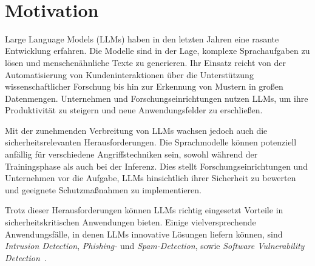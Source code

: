 \documentclass[german,exposee,master]{i1thesis}
\begin{document}
\makethetitle\

\section{Motivation}\label{sec:motivation}

Large Language Models (LLMs) haben in den letzten Jahren eine rasante Entwicklung erfahren. 
Die Modelle sind in der Lage, komplexe Sprachaufgaben zu lösen und menschenähnliche Texte zu generieren. 
Ihr Einsatz reicht von der Automatisierung von Kundeninteraktionen über die Unterstützung wissenschaftlicher Forschung bis hin zur Erkennung von Mustern in großen Datenmengen. 
Unternehmen und Forschungseinrichtungen nutzen LLMs, um ihre Produktivität zu steigern und neue Anwendungsfelder zu erschließen.

Mit der zunehmenden Verbreitung von LLMs wachsen jedoch auch die sicherheitsrelevanten Herausforderungen. 
Die Sprachmodelle können potenziell anfällig für verschiedene Angriffstechniken sein, 
sowohl während der Trainingsphase als auch bei der Inferenz. 
Dies stellt Forschungseinrichtungen und Unternehmen vor die Aufgabe, LLMs hinsichtlich ihrer Sicherheit zu bewerten und geeignete Schutzmaßnahmen zu implementieren.



Trotz dieser Herausforderungen können LLMs richtig eingesetzt Vorteile in sicherheitskritischen Anwendungen bieten. 
Einige vielversprechende Anwendungsfälle, in denen LLMs innovative Lösungen liefern können, sind \textit{Intrusion Detection}, \textit{Phishing-} und \textit{Spam-Detection}, sowie \textit{Software Vulnerability Detection}~\cite{ferrag2025}.

\end{document}
